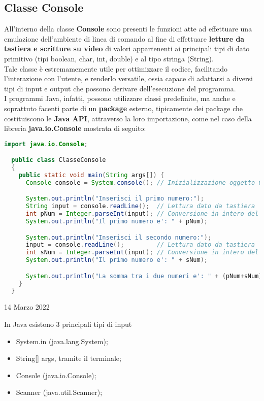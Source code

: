 \documentclass[a4paper]{extarticle}
\begin{document}
\subsection{Classe Console}
All'interno della classe \textbf{Console} sono presenti le funzioni atte ad effettuare una emulazione dell'ambiente di linea di comando al fine di effettuare \textbf{letture da tastiera e scritture su video} di valori appartenenti ai principali tipi di dato primitivo (tipi boolean, char, int, double) e al tipo stringa (String).\\
Tale classe è estremamemente utile per ottimizzare il codice, facilitando l'interazione con l'utente, e renderlo versatile, ossia capace di adattarsi a diversi tipi di input e output che possono derivare dell'esecuzione del programma.\\
I programmi Java, infatti, possono utilizzare classi predefinite, ma anche e soprattuto facenti parte di un \textbf{package} esterno, tipicamente dei package che costituiscono le \textbf{Java API}, attraverso la loro importazione, come nel caso della libreria \textbf{java.io.Console} mostrata di seguito:

\vspace{1em}
\noindent
\begin{lstlisting}[language=Java, caption=Classe Console in Java]
  import java.io.Console;

  public class ClasseConsole
  {
    public static void main(String args[]) {
      Console console = System.console(); // Inizializzazione oggetto Console

      System.out.println("Inserisci il primo numero:");
      String input = console.readLine();  // Lettura dato da tastiera
      int pNum = Integer.parseInt(input); // Conversione in intero del dato letto
      System.out.println("Il primo numero e': " + pNum);

      System.out.println("Inserisci il secondo numero:");
      input = console.readLine();         // Lettura dato da tastiera
      int sNum = Integer.parseInt(input); // Conversione in intero del dato letto
      System.out.println("Il primo numero e': " + sNum);

      System.out.println("La somma tra i due numeri e': " + (pNum+sNum));
    }
  }
\end{lstlisting}

\newpage
\noindent
\begin{center}
  14 Marzo 2022
\end{center}
In Java esistono $3$ principali tipi di input
\begin{itemize}
  \item System.in (java.lang.System);
  \item String[] args, tramite il terminale;
  \item Console (java.io.Console);
  \item Scanner (java.util.Scanner);
\end{itemize}
\end{document}
